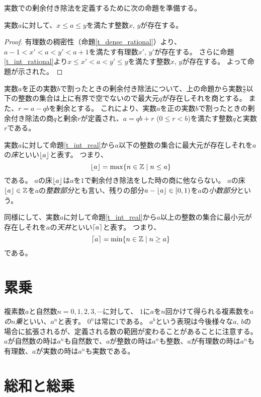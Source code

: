 実数での剰余付き除法を定義するために次の命題を準備する。

\begin{proposition}
\label{t_int_real}
実数$a$に対して、$x \le a \le y$を満たす整数$x$, $y$が存在する。
\end{proposition}

\begin{proof}
有理数の稠密性（命題\ref{t_dense_rational}）より、$a-1 < x' < a < y' < a+1$を満たす有理数$x'$, $y'$が存在する。
さらに命題\ref{t_int_rational}より$x \le x' < a < y' \le y$を満たす整数$x$, $y$が存在する。
よって命題が示された。
\end{proof}

実数$a$を正の実数$b$で割ったときの剰余付き除法について、上の命題から実数$\frac{a}{b}$以下の整数の集合は上に有界で空でないので最大元$q$が存在しそれを商とする。
また、$r = a-q b$を剰余とする。
これにより、実数$a$を正の実数$b$で割ったときの剰余付き除法の商$q$と剰余$r$が定義され、$a = q b+r$ ($0 \le r < b$)を満たす整数$q$と実数$r$である。

実数$a$に対して命題\ref{t_int_real}から$a$以下の整数の集合に最大元が存在しそれを$a$の\emph{床}といい$\lfloor a\rfloor$と表す。
つまり、
$$
\lfloor a\rfloor = \max\{ n \in \mathbb{Z} \mid n \le a \}
$$
である。
$a$の床$\lfloor a\rfloor$は$a$を$1$で剰余付き除法をした時の商に他ならない。
$a$の床$\lfloor a\rfloor \in \mathbb{Z}$を$a$の\emph{整数部分}とも言い、残りの部分$a-\lfloor a\rfloor \in [0, 1)$を$a$の\emph{小数部分}という。

同様にして、実数$a$に対して命題\ref{t_int_real}から$a$以上の整数の集合に最小元が存在しそれを$a$の\emph{天井}といい$\lceil a\rceil$と表す。
つまり、
$$
\lceil a\rceil = \min\{ n \in \mathbb{Z} \mid n \ge a \}
$$
である。

\section{累乗}

複素数$a$と自然数$n = 0, 1, 2, 3, \cdots$に対して、
$1$に$a$を$n$回かけて得られる複素数を\emph{$a$の$n$乗}といい、$a^n$と表す。
$0^n$は常に$1$である。
$a^b$という表現は今後様々な$a$, $b$の場合に拡張されるが、定義される数の範囲が変わることがあることに注意する。
$a$が自然数の時は$a^n$も自然数で、$a$が整数の時は$a^n$も整数、$a$が有理数の時は$a^n$も有理数、$a$が実数の時は$a^n$も実数である。

\section{総和と総乗}

